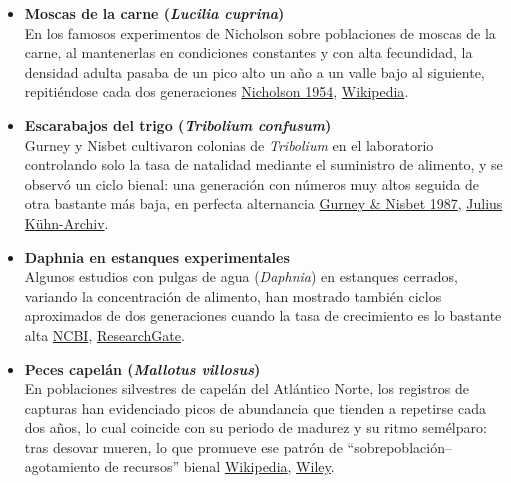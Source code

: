 \documentclass[
  10pt,
  a4paper,
  DIV=11,
  numbers=noendperiod,
  open=any]{scrreprt}
\numberwithin{equation}{chapter}
\numberwithin{equation}{chapter}
\renewcommand{\[}{\begin{equation}}
\renewcommand{\]}{\end{equation}}
\begin{document}
\begin{itemize}
\item
  \textbf{Moscas de la carne (\emph{Lucilia cuprina})}\\
  En los famosos experimentos de Nicholson sobre poblaciones de moscas
  de la carne, al mantenerlas en condiciones constantes y con alta
  fecundidad, la densidad adulta pasaba de un pico alto un año a un
  valle bajo al siguiente, repitiéndose cada dos generaciones
  \href{https://www.jstor.org/stable/827141?utm_source=chatgpt.com}{Nicholson
  1954},
  \href{https://en.wikipedia.org/wiki/Alexander_John_Nicholson?utm_source=chatgpt.com}{Wikipedia}.
\item
  \textbf{Escarabajos del trigo (\emph{Tribolium confusum})}\\
  Gurney y Nisbet cultivaron colonias de \emph{Tribolium} en el
  laboratorio controlando solo la tasa de natalidad mediante el
  suministro de alimento, y se observó un ciclo bienal: una generación
  con números muy altos seguida de otra bastante más baja, en perfecta
  alternancia
  \href{https://desharnais.sciencecourseware.org/reprints/JAE1987.pdf?utm_source=chatgpt.com}{Gurney
  \& Nisbet 1987},
  \href{https://ojs.openagrar.de/index.php/JKA/article/view/10631/9697?utm_source=chatgpt.com}{Julius
  Kühn-Archiv}.
\item
  \textbf{Daphnia en estanques experimentales}\\
  Algunos estudios con pulgas de agua (\emph{Daphnia}) en estanques
  cerrados, variando la concentración de alimento, han mostrado también
  ciclos aproximados de dos generaciones cuando la tasa de crecimiento
  es lo bastante alta
  \href{https://www.ncbi.nlm.nih.gov/books/NBK2042/?utm_source=chatgpt.com}{NCBI},
  \href{https://www.researchgate.net/publication/31983971_Large-amplitude_cycles_of_Daphnia_and_its_algal_prey_in_enriched_environments?utm_source=chatgpt.com}{ResearchGate}.
\item
  \textbf{Peces capelán (\emph{Mallotus villosus})}\\
  En poblaciones silvestres de capelán del Atlántico Norte, los
  registros de capturas han evidenciado picos de abundancia que tienden
  a repetirse cada dos años, lo cual coincide con su periodo de madurez
  y su ritmo semélparo: tras desovar mueren, lo que promueve ese patrón
  de ``sobrepoblación--agotamiento de recursos'' bienal
  \href{https://en.wikipedia.org/wiki/Capelin?utm_source=chatgpt.com}{Wikipedia},
  \href{https://onlinelibrary.wiley.com/doi/full/10.1002/edn3.415?utm_source=chatgpt.com}{Wiley}.
\end{itemize}
\end{document}
